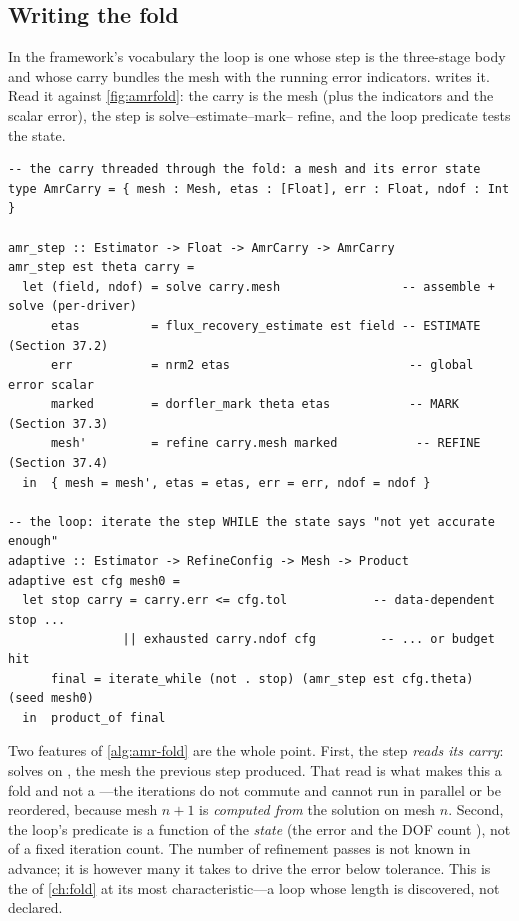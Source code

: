 \subsection{Writing the fold}

In the framework's vocabulary the loop is one  whose step is the
three-stage body and whose carry bundles the mesh with the running error indicators.
 writes it. Read it against \cref{fig:amrfold}: the carry is the
mesh (plus the indicators and the scalar error), the step is solve--estimate--mark--
refine, and the loop predicate tests the state.

\begin{lstlisting}[style=l4style,caption={The AMR loop as a state-generated \code{fold\_solve}. The schedule (the sequence of meshes) is generated from the carry, not supplied as a fixed list.},label={alg:amr-fold}]
-- the carry threaded through the fold: a mesh and its error state
type AmrCarry = { mesh : Mesh, etas : [Float], err : Float, ndof : Int }

amr_step :: Estimator -> Float -> AmrCarry -> AmrCarry
amr_step est theta carry =
  let (field, ndof) = solve carry.mesh                 -- assemble + solve (per-driver)
      etas          = flux_recovery_estimate est field -- ESTIMATE (Section 37.2)
      err           = nrm2 etas                         -- global error scalar
      marked        = dorfler_mark theta etas           -- MARK    (Section 37.3)
      mesh'         = refine carry.mesh marked           -- REFINE  (Section 37.4)
  in  { mesh = mesh', etas = etas, err = err, ndof = ndof }

-- the loop: iterate the step WHILE the state says "not yet accurate enough"
adaptive :: Estimator -> RefineConfig -> Mesh -> Product
adaptive est cfg mesh0 =
  let stop carry = carry.err <= cfg.tol            -- data-dependent stop ...
                || exhausted carry.ndof cfg         -- ... or budget hit
      final = iterate_while (not . stop) (amr_step est cfg.theta) (seed mesh0)
  in  product_of final
\end{lstlisting}

Two features of \cref{alg:amr-fold} are the whole point. First, the step \emph{reads
its carry}:  solves on , the mesh the previous step
produced. That read is what makes this a fold and not a ---the iterations do
not commute and cannot run in parallel or be reordered, because mesh $n+1$ is
\emph{computed from} the solution on mesh $n$. Second, the loop's 
predicate is a function of the \emph{state} (the error  and the
DOF count ), not of a fixed iteration count. The number of
refinement passes is not known in advance; it is however many it takes to drive the
error below tolerance. This is the  of \cref{ch:fold} at its most
characteristic---a loop whose length is discovered, not declared.

